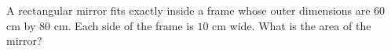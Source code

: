 A rectangular mirror fits exactly inside a frame whose outer dimensions are $60$ cm by $80$ cm. Each side of the frame is $10$ cm wide. What is the area of the mirror?
